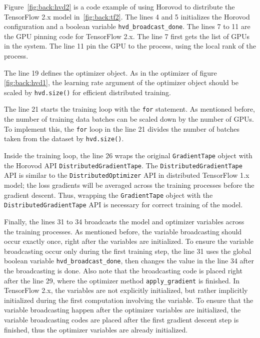 Figure~\ref{fig:back:hvd2} is a code example of using Horovod to distribute
the TensorFlow 2.x model in~\ref{fig:back:tf2}.
The lines 4 and 5 initializes the Horovod configuration and a boolean variable
{\tt hvd\_broadcast\_done}.
The lines 7 to 11 are the GPU pinning code for TensorFlow 2.x. 
The line 7 first gets the list of GPUs in the system.
The line 11 pin the GPU to the process, using the local rank of the process.

The line 19 defines the optimizer object.
As in the optimizer of figure \ref{fig:back:hvd1}, 
the learning rate argument of the optimizer object 
should be scaled by {\tt hvd.size()} for efficient distributed training. 

The line 21 starts the training loop with the {\tt for} statement.
As mentioned before, the number of training data batches can be
scaled down by the number of GPUs.
To implement this, the {\tt for} loop in the line 21
divides the number of batches taken from the dataset by {\tt hvd.size()}.

Inside the training loop,
the line 26 wraps the original {\tt GradientTape} object with the Horovod API  
{\tt DistributedGradientTape}.
The {\tt DistributedGradientTape} API is similar
to the {\tt DistributedOptimizer} API in distributed TensorFlow 1.x model; 
the loss gradients will be averaged across the training processes 
before the gradient descent.
Thus, wrapping the {\tt GradientTape} object with the 
{\tt DistributedGradientTape} API is necessary for correct training
of the model.

Finally, the lines 31 to 34 broadcasts the model and optimizer variables
across the training processes.
As mentioned before, the variable broadcasting should occur exactly once,
right after the variables are initialized.
To ensure the variable broadcasting occur only during the first training step,
the line 31 uses the global boolean variable {\tt hvd\_broadcast\_done},
then changes the value in the line 34 after the broadcasting is done.
Also note that the broadcasting code is placed right after the line 29,
where the optimizer method {\tt apply\_gradient} is finished.
In TensorFlow 2.x, the variables are not explicitly initialized,
but rather implicitly initialized during the first computation involving the
variable.
To ensure that the variable broadcasting happen after the optimizer
variables are initialized, the variable broadcasting codes are placed
after the first gradient descent step is finished, thus the optimizer
variables are already initialized.
